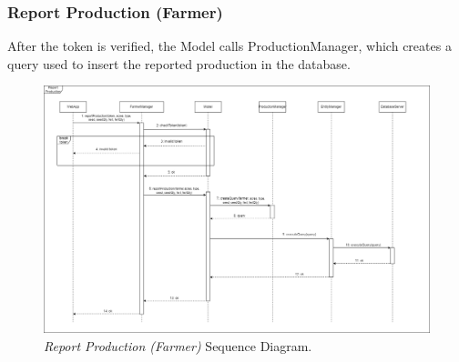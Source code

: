 \subsubsection{Report Production (Farmer)}
After the token is verified, the Model calls ProductionManager, which creates a query used to insert the reported production in the database.
\begin{figure}[H]
    \centering
    \includegraphics[width=\textwidth]{Images/Sequence Diagram/ReportProduction.png}
    \caption{\textit{Report Production (Farmer)} Sequence Diagram.}
\end{figure}
\newpage
